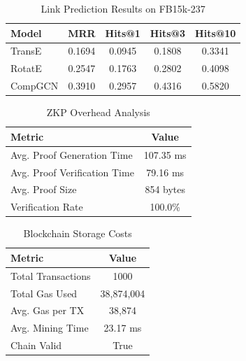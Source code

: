 \begin{table}[h]
\centering
\caption{Link Prediction Results on FB15k-237}
\label{tab:link_prediction}
\begin{tabular}{lcccc}
\hline
Model & MRR & Hits@1 & Hits@3 & Hits@10 \\
\hline
TransE & 0.1694 & 0.0945 & 0.1808 & 0.3341 \\
RotatE & 0.2547 & 0.1763 & 0.2802 & 0.4098 \\
CompGCN & 0.3910 & 0.2957 & 0.4316 & 0.5820 \\
\hline
\end{tabular}
\end{table}

\begin{table}[h]
\centering
\caption{ZKP Overhead Analysis}
\label{tab:zkp_overhead}
\begin{tabular}{lc}
\hline
Metric & Value \\
\hline
Avg. Proof Generation Time & 107.35 ms \\
Avg. Proof Verification Time & 79.16 ms \\
Avg. Proof Size & 854 bytes \\
Verification Rate & 100.0\% \\
\hline
\end{tabular}
\end{table}

\begin{table}[h]
\centering
\caption{Blockchain Storage Costs}
\label{tab:blockchain}
\begin{tabular}{lc}
\hline
Metric & Value \\
\hline
Total Transactions & 1000 \\
Total Gas Used & 38,874,004 \\
Avg. Gas per TX & 38,874 \\
Avg. Mining Time & 23.17 ms \\
Chain Valid & True \\
\hline
\end{tabular}
\end{table}